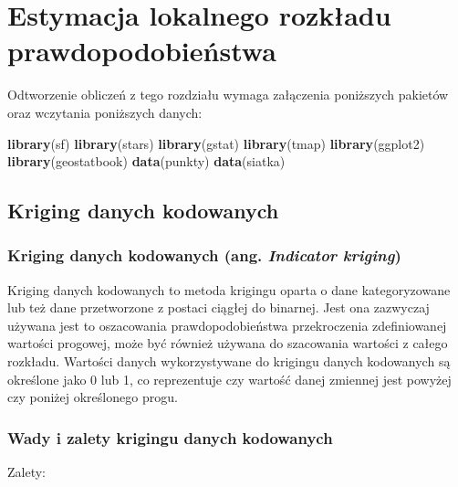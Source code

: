 \documentclass[
  paper=6in:9in,pagesize=pdftex,headinclude=on,footinclude=on,10pt]{scrbook}
\newenvironment{Shaded}{\begin{snugshade}}{\end{snugshade}}
\newcommand{\FunctionTok}[1]{\textcolor[rgb]{0.13,0.29,0.53}{\textbf{#1}}}
\newcommand{\NormalTok}[1]{#1}
\begin{document}
\chapter{Estymacja lokalnego rozkładu prawdopodobieństwa}\label{estymacja-lokalnego-rozkadu-prawdopodobienstwa}

Odtworzenie obliczeń z tego rozdziału wymaga załączenia poniższych pakietów oraz wczytania poniższych danych:

\begin{Shaded}
\begin{Highlighting}[]
\FunctionTok{library}\NormalTok{(sf)}
\FunctionTok{library}\NormalTok{(stars)}
\FunctionTok{library}\NormalTok{(gstat)}
\FunctionTok{library}\NormalTok{(tmap)}
\FunctionTok{library}\NormalTok{(ggplot2)}
\FunctionTok{library}\NormalTok{(geostatbook)}
\FunctionTok{data}\NormalTok{(punkty)}
\FunctionTok{data}\NormalTok{(siatka)}
\end{Highlighting}
\end{Shaded}

\section{Kriging danych kodowanych}\label{kriging-danych-kodowanych}

\subsection{\texorpdfstring{Kriging danych kodowanych (ang. \emph{Indicator kriging})}{Kriging danych kodowanych (ang. Indicator kriging)}}\label{kriging-danych-kodowanych-ang.-indicator-kriging}

Kriging danych kodowanych to metoda krigingu oparta o dane kategoryzowane lub też dane przetworzone z postaci ciągłej do binarnej.
Jest ona zazwyczaj używana jest to oszacowania prawdopodobieństwa przekroczenia zdefiniowanej wartości progowej, może być również używana do szacowania wartości z całego rozkładu.
Wartości danych wykorzystywane do krigingu danych kodowanych są określone jako 0 lub 1, co reprezentuje czy wartość danej zmiennej jest powyżej czy poniżej określonego progu.

\subsection{Wady i zalety krigingu danych kodowanych}\label{wady-i-zalety-krigingu-danych-kodowanych}

Zalety:
\end{document}

